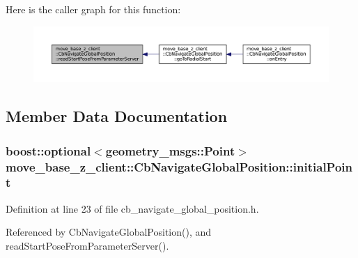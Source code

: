 Here is the caller graph for this function\+:
\nopagebreak
\begin{figure}[H]
\begin{center}
\leavevmode
\includegraphics[width=350pt]{classmove__base__z__client_1_1CbNavigateGlobalPosition_a866ea02c9e25ac1df9df88272deb04b3_icgraph}
\end{center}
\end{figure}




\subsection{Member Data Documentation}
\subsubsection[{\texorpdfstring{initial\+Point}{initialPoint}}]{\setlength{\rightskip}{0pt plus 5cm}boost\+::optional$<$geometry\+\_\+msgs\+::\+Point$>$ move\+\_\+base\+\_\+z\+\_\+client\+::\+Cb\+Navigate\+Global\+Position\+::initial\+Point}\hypertarget{classmove__base__z__client_1_1CbNavigateGlobalPosition_a603d293ad4557e8332fcfd264d7075d4}{}\label{classmove__base__z__client_1_1CbNavigateGlobalPosition_a603d293ad4557e8332fcfd264d7075d4}


Definition at line 23 of file cb\+\_\+navigate\+\_\+global\+\_\+position.\+h.



Referenced by Cb\+Navigate\+Global\+Position(), and read\+Start\+Pose\+From\+Parameter\+Server().

